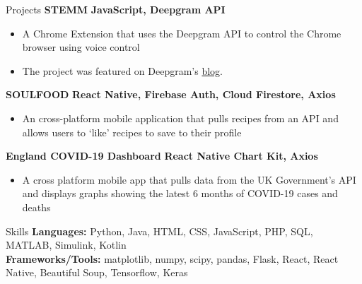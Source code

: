 \documentclass{resume}
\begin{document}
    
    \begin{rSection}{Projects}
        {\bf STEMM} \hfill {\bf JavaScript, Deepgram API}
        \begin{itemize}[nolistsep]
            \item A Chrome Extension that uses the Deepgram API to control the Chrome browser using voice control
            \item The project was featured on Deepgram's \href{https://developers.deepgram.com/blog/2022/03/voice-control-browser-stemm/}{blog}. 
        \end{itemize}

        {\bf SOULFOOD} \hfill {\bf React Native, Firebase Auth, Cloud Firestore, Axios}
        \begin{itemize}[nolistsep]
            \item An cross-platform mobile application that pulls recipes from an API and allows users to `like' recipes to save to their profile
        \end{itemize}

        {\bf England COVID-19 Dashboard} \hfill {\bf React Native Chart Kit, Axios}
        \begin{itemize}[nolistsep]
            \item A cross platform mobile app that pulls data from the UK Government's API and displays graphs showing the latest 6 months of COVID-19 cases and deaths
        \end{itemize}
    \end{rSection}
    \begin{rSection}{Skills}
        \textbf{Languages:} Python, Java, HTML, CSS, JavaScript, PHP, SQL, MATLAB, Simulink, Kotlin\\
        \textbf{Frameworks/Tools:} matplotlib, numpy, scipy, pandas, Flask, React, React Native, Beautiful Soup, Tensorflow, Keras \\ 
    \end{rSection}
\end{document}
